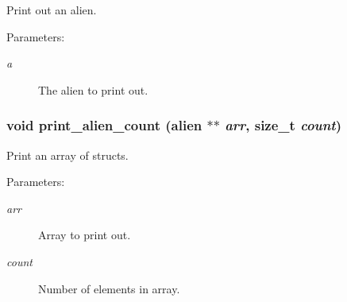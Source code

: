 Print out an alien. 

\begin{Desc}
\item[Parameters:]
\begin{description}
\item[{\em a}]The alien to print out. \end{description}
\end{Desc}
\subsubsection{\setlength{\rightskip}{0pt plus 5cm}void print\_\-alien\_\-count (\bf{alien} $\ast$$\ast$ {\em arr}, size\_\-t {\em count})}\label{struct_8c_96c379831d4206c4a5670f8ab170f716}


Print an array of structs. 

\begin{Desc}
\item[Parameters:]
\begin{description}
\item[{\em arr}]Array to print out. \item[{\em count}]Number of elements in array. \end{description}
\end{Desc}
